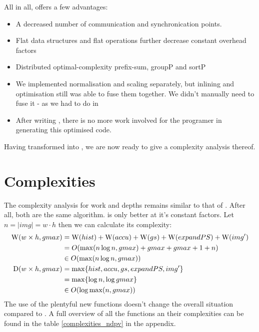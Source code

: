     All in all, \ndpv offers a few advantages:
    \begin{itemize}
      \item A decreased number of communication and synchronication points.
      \item Flat data structures and flat operations further decrease constant overhead factors 
      \item Distributed optimal-complexity prefix-sum, groupP and sortP
      \item We implemented normalisation and scaling separately, but inlining
              and optimisation still was able to fuse them together. We didn't
              manually need to fuse it - as we had to do in \man
      \item After writing \ndpn, there is no more work involved for the programer in generating this optimised code.
    \end{itemize}
    Having transformed \ndpn into \ndpv, we are now ready to give a complexity analysis thereof.
    
  \section{Complexities}
    The complexity analysis for work and depths remains similar to that of \ndpn.
    After all, both are the same algorithm. \ndpv is only better at it's constant factors.
    Let $n = |img| = w\cdot h$ then we can calculate its complexity:
    \begin{equation}
    \begin{split}
    \textrm{W}(w \times h,gmax)
          & = \textrm{W}(hist) + \textrm{W}(accu) + \textrm{W}(gs) + \textrm{W}(expandPS) + \textrm{W}(img') \\
          & = O( \max(n \log n, gmax) + gmax + gmax + 1 + n) \\
          & \in O(\max(n \log n, gmax)) \\
    \textrm{D}(w \times h,gmax)
        & = \max \{ hist, accu, gs, expandPS, img'\} \\
        & = \max \{\log n, \log gmax \} \\
        & \in O(\log \max(n,gmax)) \\
    \end{split}
    \end{equation}
    The use of the plentyful new functions doesn't change the overall situation compared to \ndpn.
    A full overview of all the functions an their complexities can be found in the table \ref{complexities_ndpv} in the appendix.
    
    
    
    
